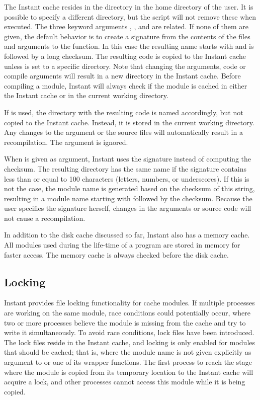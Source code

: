 The Instant cache resides in the directory  in the
home directory of the user. It is possible to specify a different directory, but the
 script will not remove these when executed.
The three keyword arguments , , and
 are related. If none of them are given, the default behavior is to
create a signature from the contents of the files and arguments to the
 function. In this case the resulting name starts with
 and is followed by a long checksum. The
resulting code is copied to the Instant cache
unless  is set to a specific directory. Note that
changing the arguments, code or compile arguments will result in a new
directory in the Instant cache. Before compiling a module, Instant
will always check if the module is cached in either the Instant cache
or in the current working directory.

If  is used, the directory with the resulting code is
named accordingly, but not copied to the Instant cache. Instead, it is
stored in the current working directory. Any changes to the argument
or the source files will automatically result in a recompilation. The
argument  is ignored.

When  is given as argument, Instant uses the signature
instead of computing the checksum. The resulting directory has the
same name if the signature contains less than or equal to 100
characters (letters, numbers, or underscores). If this is not the
case, the module name is generated based on the checksum of this
string, resulting in a module name starting
with  followed by the checksum. Because the
user specifies the signature herself, changes in the arguments or
source code will not cause a recompilation.

In addition to the disk cache discussed so far, Instant also has a
memory cache. All modules used during the life-time of a program are
stored in memory for faster access. The memory cache is always checked
before the disk cache.

\subsection{Locking}

Instant provides file locking functionality for cache modules. If
multiple processes are working on the same module, race conditions
could potentially occur, where two or more processes believe the
module is missing from the cache and try to write it
simultaneously. To avoid race conditions, lock files have been
introduced. The lock files reside in the Instant cache, and locking is
only enabled for modules that should be cached; that is, where the
module name is not given explicitly as argument
to  or one of its wrapper functions. The first
process to reach the stage where the module is copied from its
temporary location to the Instant cache will acquire a lock, and other
processes cannot access this module while it is being copied.

